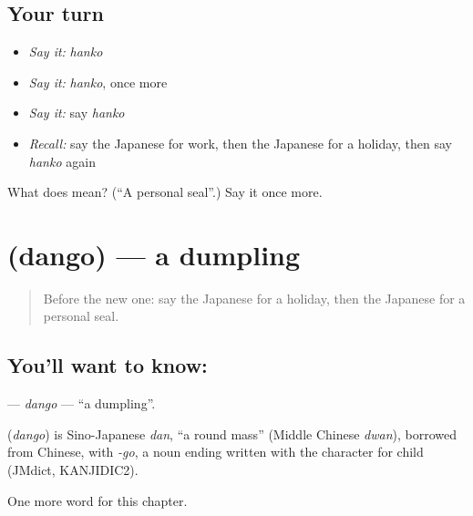 \subsection*{Your turn}
\begin{itemize}
\raggedright
  \item \emph{Say it:} \emph{hanko}
  \item \emph{Say it:} \emph{hanko}, once more
  \item \emph{Say it:} say \emph{hanko}
  \item \emph{Recall:} say the Japanese for work, then the Japanese for a holiday, then say \emph{hanko} again
\end{itemize}

\begin{tcolorbox}[breakable,colback=teal!4,colframe=teal!35!black,title={Before you move on}]
What does  mean? (\textquotedblleft{}A personal seal\textquotedblright{}.) Say it once more.
\end{tcolorbox}
\section[\texorpdfstring{\ja{だんご} (dango)}{だんご (dango)}]{ (dango) — a dumpling}

\label{lesson:JA-C113-dango}



\begin{quote}
Before the new one: say the Japanese for a holiday, then the Japanese for a personal seal.
\end{quote}

\subsection*{You'll want to know: }
\textbf{} — \emph{dango} — \textquotedblleft{}a dumpling\textquotedblright{}.

\begin{cousinweb}
\textbf{} (\emph{dango}) is Sino-Japanese \emph{dan}, \textquotedblleft{}a round mass\textquotedblright{} (Middle Chinese \emph{dwan}), borrowed from Chinese, with \emph{-go}, a noun ending written with the character for child (JMdict, KANJIDIC2).
\end{cousinweb}

\begin{grammarlens}[title={What you've built}]
One more word for this chapter.
\end{grammarlens}

